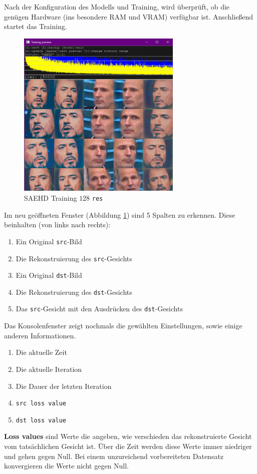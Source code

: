 Nach der Konfiguration des Modells und Training, wird überprüft, ob die genügen Hardware (ins besondere RAM und VRAM) verfügbar ist.
Anschließend startet das Training.
\begin{figure}
    \center
    \includegraphics[width=0.7\textwidth]{Bilder/DFL/saehd-train-f}
    \caption{SAEHD Training $128$ \texttt{res}}
    \label{fig:saehd-training}
\end{figure}
Im neu geöffneten Fenster (Abbildung \ref{fig:saehd-training}) sind 5 Spalten zu erkennen.
Diese beinhalten (von links nach rechts):
\begin{enumerate}
    \item Ein Original \texttt{src}-Bild
    \item Die Rekonstruierung des \texttt{src}-Gesichts
    \item Ein Original \texttt{dst}-Bild
    \item Die Rekonstruierung des \texttt{dst}-Gesichts
    \item Das \texttt{src}-Gesicht mit den Ausdrücken des \texttt{dst}-Gesichts
\end{enumerate}
Das Konsolenfenster zeigt nochmals die gewählten Einstellungen, sowie einige anderen Informationen.
\begin{enumerate}
    \item Die aktuelle Zeit
    \item Die aktuelle Iteration
    \item Die Dauer der letzten Iteration
    \item \texttt{src loss value}
    \item \texttt{dst loss value}
\end{enumerate}
\textbf{Loss values} sind Werte die angeben, wie verschieden das rekonstruierte Gesicht vom tatsächlichen Gesicht ist.
Über die Zeit werden diese Werte immer niedriger und gehen gegen Null.
Bei einem unzureichend vorbereiteten Datensatz konvergieren die Werte nicht gegen Null.


